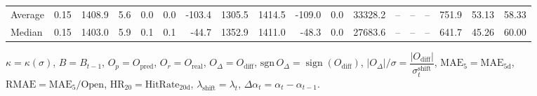\begin{threeparttable}
{\begin{tabular}{lrrrrrrrrrrrrrrrrr}
Average &     0.15 & 1408.9 &               5.6 &               0.0 &                0.0 &             -103.4 &  1305.5 & 1414.5 &     -109.0 &                      0.0 &             33328.2 &         -- &        -- &             -- &            751.9 &           53.13 &                  58.33 \\
 Median &     0.15 & 1403.0 &               5.9 &               0.1 &                0.1 &              -44.7 &  1352.9 & 1411.0 &      -48.3 &                      0.0 &             27683.6 &         -- &        -- &             -- &            641.7 &           45.26 &                  60.00 \\
\bottomrule
\end{tabular}
}
\begin{tablenotes}\footnotesize
\item $\kappa=\kappa(\sigma)$, $B=B_{t-1}$, $O_p=O_{\text{pred}}$, $O_r=O_{\text{real}}$, $O_\Delta=O_{\text{diff}}$, $\mathrm{sgn}\,O_\Delta=\operatorname{sign}(O_{\text{diff}})$, $|O_\Delta|/\sigma=\dfrac{|O_{\text{diff}}|}{\sigma_t^{\text{shift}}}$, $\mathrm{MAE}_5=\mathrm{MAE}_{5\text{d}}$, $\mathrm{RMAE}= \mathrm{MAE}_5 / \text{Open}$, $\mathrm{HR}_{20}=\mathrm{HitRate}_{20\text{d}}$, 
$\lambda_{\text{shift}}=\lambda_t$, 
$\Delta\alpha_t=\alpha_t-\alpha_{t-1}$.
\end{tablenotes}
\end{threeparttable}
\endgroup


